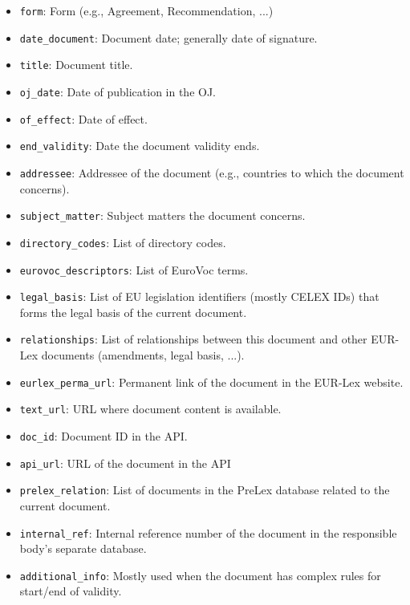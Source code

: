 \documentclass[sigconf, authorversion]{acmart}
\begin{document}
\begin{itemize}
    \item \texttt{form}: Form (e.g., Agreement, Recommendation, ...)
    \item \texttt{date\_document}: Document date; generally date of signature.
    \item \texttt{title}: Document title.
    \item \texttt{oj\_date}: Date of publication in the OJ.
    \item \texttt{of\_effect}: Date of effect.
    \item \texttt{end\_validity}: Date the document validity ends.
    \item \texttt{addressee}: Addressee of the document (e.g., countries to which the document concerns).
    \item \texttt{subject\_matter}: Subject matters the document concerns.
    \item \texttt{directory\_codes}: List of directory codes.
    \item \texttt{eurovoc\_descriptors}: List of EuroVoc terms.
    \item \texttt{legal\_basis}: List of EU legislation identifiers (mostly CELEX IDs) that forms the legal basis of the current document.
    \item \texttt{relationships}: List of relationships between this document and other EUR-Lex documents (amendments, legal basis, ...).
    
    \item \texttt{eurlex\_perma\_url}: Permanent link of the document in the EUR-Lex website.

    \item \texttt{text\_url}: URL where document content is available.

    \item \texttt{doc\_id}: Document ID in the API.
    \item \texttt{api\_url}: URL of the document in the API
    \item \texttt{prelex\_relation}: List of documents in the PreLex database related to the current document.
    \item \texttt{internal\_ref}: Internal reference number of the document in the responsible body's separate database.
    \item \texttt{additional\_info}: Mostly used when the document has complex rules for start/end of validity.
\end{itemize}
\end{document}

